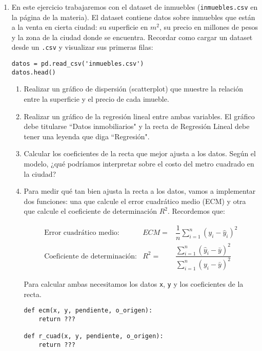 \documentclass[a4paper,11pt]{article}
\theoremstyle{definition}
\begin{document}
\begin{enumerate}[resume]
\item En este ejercicio trabajaremos con el dataset de inmuebles (\texttt{inmuebles.csv} en la página de la materia). El dataset contiene datos sobre inmuebles que están a la venta en cierta ciudad: su superficie en $m^2$, su precio en millones de pesos y la zona de la ciudad donde se encuentra. Recordar como cargar un dataset desde un \texttt{.csv} y visualizar sus primeras filas:
\vspace{0.2cm}
\begin{lstlisting}
datos = pd.read_csv('inmuebles.csv')
datos.head()
\end{lstlisting}

\begin{enumerate}
    \item Realizar un gráfico de dispersión (scatterplot) que muestre la relación entre la superficie y el precio de cada imueble.
    
    \item Realizar un gráfico de la regresión lineal entre ambas variables. El gráfico debe titularse ``Datos inmobiliarios" y la recta de Regresión Lineal debe tener una leyenda que diga ``Regresión".
    
    \item Calcular los coeficientes de la recta que mejor ajusta a los datos. Según el modelo, ¿qué podríamos interpretar sobre el costo del metro cuadrado en la ciudad?
    
    \item Para medir qué tan bien ajusta la recta a los datos, vamos a implementar dos funciones: una que calcule el error cuadrático medio (ECM) y otra que calcule el coeficiente de determinación $R^2$. Recordemos que:

    \[
    \begin{array}{rrl}
        \text{Error cuadrático medio:} & ECM =& \dfrac{1}{n}\displaystyle \sum_{i=1}^n (y_i - \hat{y}_i)^2 \\[2em]
         \text{Coeficiente de determinación:}& R^2 =& \dfrac{\displaystyle\sum_{i=1}^n (\hat{y}_i - \bar{y})^2}{\displaystyle\sum_{i=1}^n (y_i - \bar{y})^2} 
    \end{array}
    \]

    Para calcular ambas necesitamos los datos \texttt{x}, \texttt{y} y los coeficientes de la recta.

\begin{lstlisting}
def ecm(x, y, pendiente, o_origen):      
    return ???

def r_cuad(x, y, pendiente, o_origen):
    return ???
\end{lstlisting}


\end{enumerate}
\end{enumerate}
\end{document}
